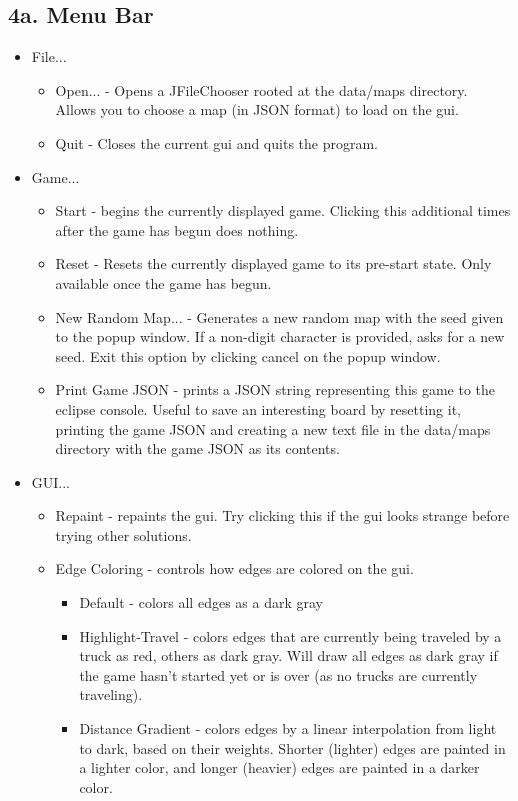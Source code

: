 \documentclass[11pt]{article}
\begin{document}
\subsection{4a. Menu Bar}
\begin{itemize}
\item File...
\begin{itemize}
\item Open... - Opens a JFileChooser rooted at the data/maps directory. Allows
	you to choose a map (in JSON format) to load on the gui.
\item Quit - Closes the current gui and quits the program.
\end{itemize}
\item Game...
\begin{itemize}
\item Start - begins the currently displayed game. Clicking this additional
	times after the game has begun does nothing.
\item Reset - Resets the currently displayed game to its pre-start state. Only
	available once the game has begun.
\item New Random Map... - Generates a new random map with the seed given to the
	popup window. If a non-digit character is provided, asks for a new seed.
	Exit this option by clicking cancel on the popup window.
\item Print Game JSON - prints a JSON string representing this game to the
	eclipse console. Useful to save an interesting board by resetting it,
	printing the game JSON and creating a new text file in the data/maps
	directory with the game JSON as its contents.
\end{itemize}
\item GUI...
\begin{itemize}
\item Repaint - repaints the gui. Try clicking this if the gui looks strange
	before trying other solutions.
\item Edge Coloring - controls how edges are colored on the gui.
\begin{itemize}
\item Default - colors all edges as a dark gray
\item Highlight-Travel - colors edges that are currently being traveled by a
	truck as red, others as dark gray. Will draw all edges as dark gray if the
	game hasn't started yet or is over (as no trucks are currently traveling).
\item Distance Gradient - colors edges by a linear interpolation from light to
	dark, based on their weights. Shorter (lighter) edges are painted in a
	lighter color, and longer (heavier) edges are painted in a  darker color.
\end{itemize}
\end{itemize}
\end{itemize}
\end{document}

